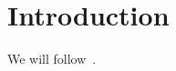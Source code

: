 \documentclass[oneside,11pt]{article}
\begin{document}
\maketitle
\tableofcontents

\section{Introduction}

We will follow~\cite{koltchinskii2008}.

\newpage
\nocite{} %
\printbibliography
\end{document}
